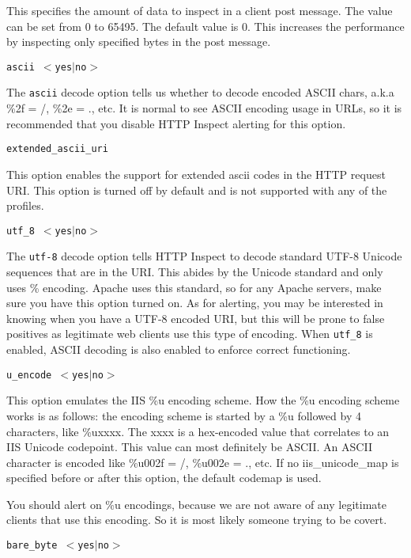 \documentclass[english]{report}
\newcounter{slistnum}
\newenvironment{slist}
{ \begin{list}{ {\bf \arabic{slistnum}.} }{\usecounter{slistnum} } }
{ \end{list} }
\begin{document}
\begin{slist}
This specifies the amount of data to inspect in a client post message. The 
value can be set from 0 to 65495. The default value is 0. This increases the 
performance by inspecting only specified bytes in the post message.

\item \texttt{ascii $<$yes$|$no$>$}

The \texttt{ascii} decode option tells us whether to decode encoded ASCII
chars, a.k.a \%2f = /, \%2e = ., etc.  It is normal to see ASCII encoding usage
in URLs, so it is recommended that you disable HTTP Inspect alerting for this
option.

\item \texttt{extended\_ascii\_uri}

This option enables the support for extended ascii codes in the HTTP request
URI. This option is turned off by default and is not supported with any of
the profiles.

\item \texttt{utf\_8 $<$yes$|$no$>$}

The \texttt{utf-8} decode option tells HTTP Inspect to decode standard UTF-8
Unicode sequences that are in the URI.  This abides by the Unicode standard and
only uses \% encoding.  Apache uses this standard, so for any Apache servers,
make sure you have this option turned on.  As for alerting, you may be
interested in knowing when you have a UTF-8 encoded URI, but this will be prone
to false positives as legitimate web clients use this type of encoding.  When
\texttt{utf\_8} is enabled, ASCII decoding is also enabled to enforce correct
functioning.  

\item \texttt{u\_encode $<$yes$|$no$>$}

This option emulates the IIS \%u encoding scheme.  How the \%u encoding scheme
works is as follows:  the encoding scheme is started by a \%u followed by 4
characters, like \%uxxxx.  The xxxx is a hex-encoded value that correlates to
an IIS Unicode codepoint.  This value can most definitely be ASCII.  An ASCII
character is encoded like \%u002f = /, \%u002e = ., etc.  If no
iis\_unicode\_map is specified before or after this option, the default codemap
is used.

You should alert on \%u encodings, because we are not aware of any legitimate
clients that use this encoding.  So it is most likely someone trying to be
covert.

\item \texttt{bare\_byte $<$yes$|$no$>$}


\end{slist}
\end{document}
